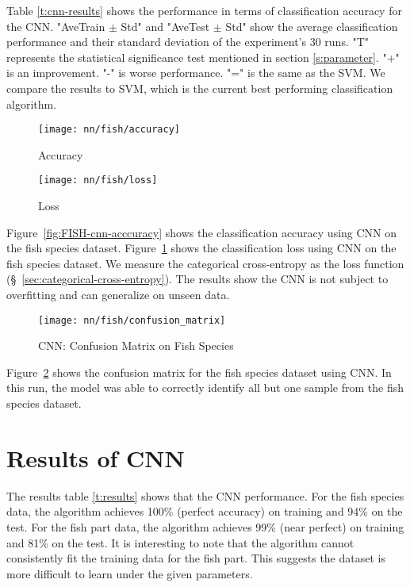 Table \ref{t:cnn-results} shows the performance in terms of classification accuracy for the CNN. "AveTrain $\pm$ Std" and "AveTest $\pm$ Std" show the average classification performance and their standard deviation of the experiment's 30 runs. "T" represents the statistical significance test mentioned in section \ref{s:parameter}. "+" is an improvement. "-" is worse performance. "=" is the same as the SVM. We compare the results to SVM, which is the current best performing classification algorithm.

\begin{figure}[H]
    \centering
    \begin{minipage}{.5\textwidth}
        \centering
        \texttt{[image: nn/fish/accuracy]}
        \caption{Accuracy}
        \label{fig:FISH-cnn-acccuracy}
    \end{minipage}%
    \begin{minipage}{.5\textwidth}
        \centering
        \texttt{[image: nn/fish/loss]}
        \caption{Loss}
        \label{fig:FISH-cnn-loss}
    \end{minipage}
\end{figure}

Figure~\ref{fig:FISH-cnn-acccuracy} shows the classification accuracy using CNN on the fish species dataset. Figure~\ref{fig:FISH-cnn-loss} shows the classification loss using CNN on the fish species dataset. We measure the categorical cross-entropy as the loss function (\S~\ref{sec:categorical-cross-entropy}). The results show the CNN is not subject to overfitting and can generalize on unseen data.

\begin{figure}[H]
    \centering
    \texttt{[image: nn/fish/confusion\_matrix]}
    \caption{CNN: Confusion Matrix on Fish Species}
    \label{fig:FISH-cnn-confusion}
\end{figure}

Figure~\ref{fig:FISH-cnn-confusion} shows the confusion matrix for the fish species dataset using CNN. In this run, the model was able to correctly identify all but one sample from the fish species dataset.

\section{Results of CNN}

The results table \ref{t:results} shows that the CNN performance. For the fish species data, the algorithm achieves 100\% (perfect accuracy) on training and 94\% on the test. For the fish part data, the algorithm achieves 99\% (near perfect) on training and 81\% on the test. It is interesting to note that the algorithm cannot consistently fit the training data for the fish part. This suggests the dataset is more difficult to learn under the given parameters.

